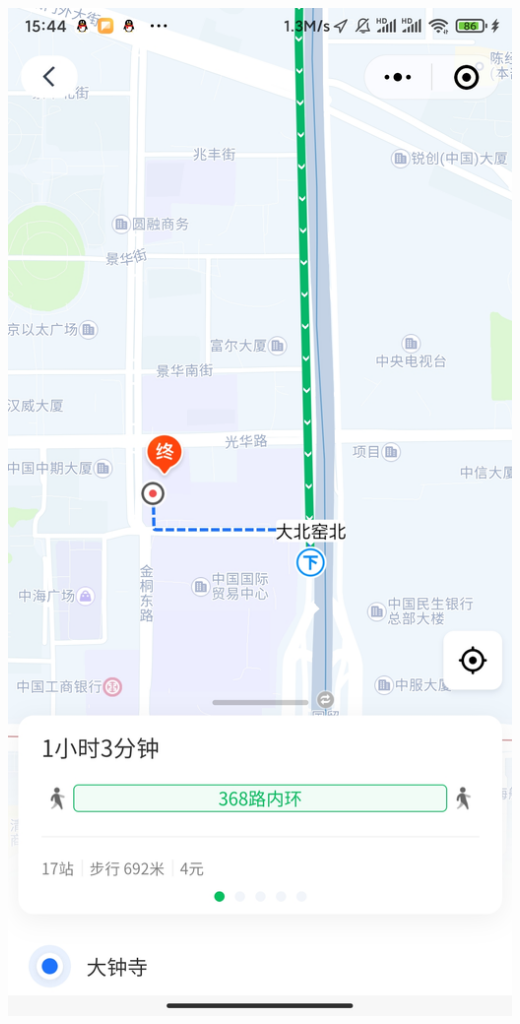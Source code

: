 \documentclass{beamer}
\begin{document}
\begin{frame}
    \begin{columns}
        \includegraphics[width=0.7\linewidth]{figure/map_example-tencent-detail.jpg}
        

\end{columns}
\end{frame}
\end{document}
